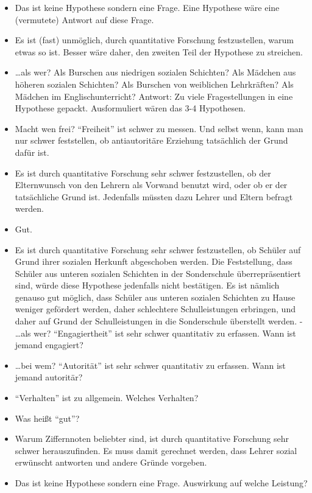 \documentclass[
]{book}
\providecommand{\tightlist}{%
  \setlength{\itemsep}{0pt}\setlength{\parskip}{0pt}}
\begin{document}
\begin{itemize}
\tightlist
\item
  Das ist keine Hypothese sondern eine Frage. Eine Hypothese wäre eine (vermutete) Antwort auf diese Frage.
\item
  Es ist (fast) unmöglich, durch quantitative Forschung festzustellen, warum etwas so
  ist. Besser wäre daher, den zweiten Teil der Hypothese zu streichen.
\item
  \ldots als wer? Als Burschen aus niedrigen sozialen Schichten? Als Mädchen aus höheren sozialen Schichten? Als Burschen von weiblichen Lehrkräften? Als Mädchen im Englischunterricht? Antwort: Zu viele Fragestellungen in eine Hypothese gepackt. Ausformuliert wären das 3-4 Hypothesen.
\item
  Macht wen frei? ``Freiheit'' ist schwer zu messen. Und selbst wenn, kann man nur schwer feststellen, ob antiautoritäre Erziehung tatsächlich der Grund dafür ist.
\item
  Es ist durch quantitative Forschung sehr schwer festzustellen, ob der Elternwunsch
  von den Lehrern als Vorwand benutzt wird, oder ob er der tatsächliche Grund ist. Jedenfalls müssten dazu Lehrer und Eltern befragt werden.
\item
  Gut.
\item
  Es ist durch quantitative Forschung sehr schwer festzustellen, ob Schüler auf Grund
  ihrer sozialen Herkunft abgeschoben werden. Die Feststellung, dass Schüler aus unteren sozialen Schichten in der Sonderschule überrepräsentiert sind, würde diese Hypothese jedenfalls nicht bestätigen. Es ist nämlich genauso gut möglich, dass Schüler aus unteren sozialen Schichten zu Hause weniger gefördert werden, daher schlechtere Schulleistungen erbringen, und daher auf Grund der Schulleistungen in die Sonderschule überstellt werden. - \ldots als wer? ``Engagiertheit'' ist sehr schwer quantitativ zu erfassen. Wann ist jemand engagiert?
\item
  \ldots bei wem? ``Autorität'' ist sehr schwer quantitativ zu erfassen. Wann ist jemand autoritär?
\item
  ``Verhalten'' ist zu allgemein. Welches Verhalten?
\item
  Was heißt ``gut''?
\item
  Warum Ziffernnoten beliebter sind, ist durch quantitative Forschung sehr schwer herauszufinden. Es muss damit gerechnet werden, dass Lehrer sozial erwünscht antworten und andere Gründe vorgeben.
\item
  Das ist keine Hypothese sondern eine Frage. Auswirkung auf welche Leistung?
\end{itemize}
\end{document}
